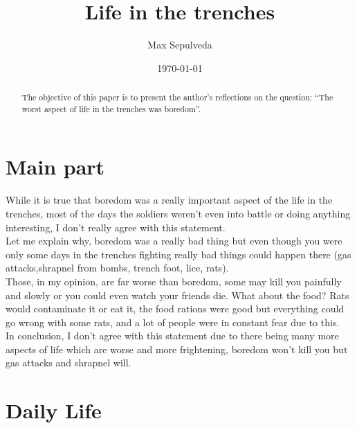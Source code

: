 \documentclass[letterpaper,12pt]{article}
\begin{document}
\title{Life in the trenches}
\author{Max Sepulveda}
\date{\today}
\maketitle

\begin{abstract}
The objective of this paper is to present the author's reflections on the question: ``The worst aspect of life in the trenches was boredom''.

\end{abstract}

\section{Main part}

While it is true that boredom was a really important aspect of the life in the trenches, most of the days the soldiers weren't even into battle or doing anything interesting, I don't really agree with this statement.\\

Let me explain why, boredom was a really bad thing but even though you were only some days in the trenches fighting really bad things could happen there (gas attacks,shrapnel from bombs, trench foot, lice, rats). \\

Those, in my opinion, are far worse than boredom, some may kill you painfully and slowly or you could even watch your friends die. 
What about the food? Rats would contaminate it or eat it, the food rations were good but everything could go wrong with some rats, and a lot of people were in constant fear due to this. \\

In conclusion, I don't agree with this statement due to there being many more aspects of life which are worse and more frightening, boredom won’t kill you but gas attacks and shrapnel will.

\nocite{whatwas}
\nocite{photos}

\pagebreak

\section{Daily Life}
\end{document}
